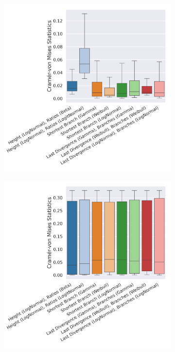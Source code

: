 \documentclass[10pt,letterpaper]{article}
\begin{document}
\begin{figure}
	\begin{subfigure}[b]{0.45\textwidth}
		\centering
		\includegraphics[width=\textwidth]{figures/yule-400-ccd1-cvm.png}
	\end{subfigure}
	\begin{subfigure}[b]{0.45\textwidth}
		\centering
		\includegraphics[width=\textwidth]{figures/bio-ccd1-cvm.png}
	\end{subfigure}
	
	\label{fig:cramer-von-mises}
\end{figure}
\end{document}
